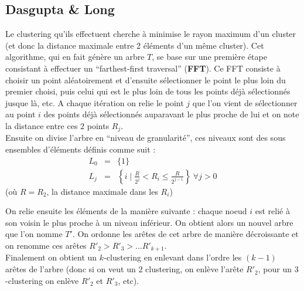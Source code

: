 \documentclass{article}
\begin{document}
\begin{sffamily}
\newpage
\section{Dasgupta \& Long}

Le clustering qu'ils effectuent cherche à minimise le rayon maximum d'un cluster (et donc la distance maximale entre 2 éléments d'un même 
cluster). Cet algorithme, qui en fait génère un arbre $T$, se base sur une première étape consistant à effectuer un ``farthest-first 
traversal'' (\textbf{FFT}). Ce FFT consiste à choisir un point aléatoirement et d'ensuite sélectionner le point le plus loin du premier 
choisi, puis celui qui est le plus loin de tous les points déjà sélectionnés jusque là, etc. A chaque itération on relie le point $j$ que 
l'on vient de sélectionner au point $i$ des points déjà sélectionnés auparavant le plus proche de lui et on note la distance entre ces $2$ 
points $R_j$. \\

Ensuite on divise l'arbre en ``niveau de granularité'', ces niveaux sont des sous ensembles d'éléments définis comme suit :
\begin{eqnarray}
\nonumber L_0 &=& \{1\} \\
\nonumber L_j &=& \left\{ i \mid \frac{R}{2^j} < R_i \leq \frac{R}{2^{j-1}} \right\}\ \forall j > 0
\end{eqnarray} 
(où $R=R_2$, la distance maximale dans les $R_i$)

On relie ensuite les éléments de la manière suivante : chaque noeud $i$ est relié à son voisin le plus proche à un niveau inférieur. On 
obtient alors un nouvel arbre que l'on nomme $T'$. On ordonne les arêtes de cet arbre de manière décroissante et on renomme ces arêtes $R'_2 
> R'_3 > \ldots R'_{k+1}$.\\

Finalement on obtient un $k$-clustering en enlevant dans l'ordre les $(k-1)$ arêtes de l'arbre (donc si on veut un $2$ clustering, on enlève 
l'arête $R'_2$, pour un $3$-clustering on enlève $R'_2$ et $R'_3$, etc).
\end{sffamily}
\end{document}

